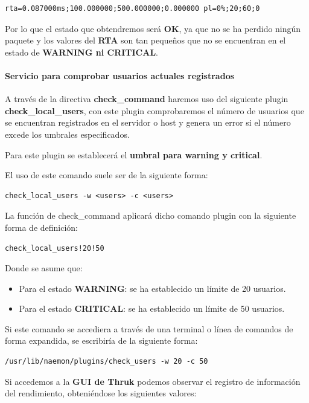 \begin{lstlisting}
rta=0.087000ms;100.000000;500.000000;0.000000 pl=0%;20;60;0
\end{lstlisting}

Por lo que el estado que obtendremos será \textbf{OK}, ya que no se ha perdido ningún paquete y los valores del \textbf{RTA} son tan pequeños que no se encuentran en el estado de \textbf{WARNING ni CRITICAL}.

\paragraph{Servicio para comprobar usuarios actuales registrados}

A través de la directiva \textbf{check\_command} haremos uso del siguiente plugin \textbf{check\_local\_users}, con este plugin comprobaremos el número de usuarios que se encuentran registrados en el servidor o host y genera un error si el número excede los umbrales especificados.

Para este plugin se establecerá el \textbf{umbral para warning y critical}.

El uso de este comando suele ser de la siguiente forma:
\begin{lstlisting}
check_local_users -w <users> -c <users>
\end{lstlisting}

La función de check\_command aplicará dicho comando plugin con la siguiente forma de definición:
\begin{lstlisting}
check_local_users!20!50
\end{lstlisting} 

Donde se asume que:
\begin{itemize}
	\item Para el estado \textbf{WARNING}: se ha establecido un límite de 20 usuarios.
	\item Para el estado \textbf{CRITICAL}: se ha establecido un límite de 50 usuarios.
\end{itemize}

Si este comando se accediera a través de una terminal o línea de comandos de forma expandida, se escribiría de la siguiente forma:

\begin{lstlisting}
/usr/lib/naemon/plugins/check_users -w 20 -c 50
\end{lstlisting}
\newpage
Si accedemos a la \textbf{GUI de Thruk} podemos observar el registro de información del rendimiento, obteniéndose los siguientes valores:

